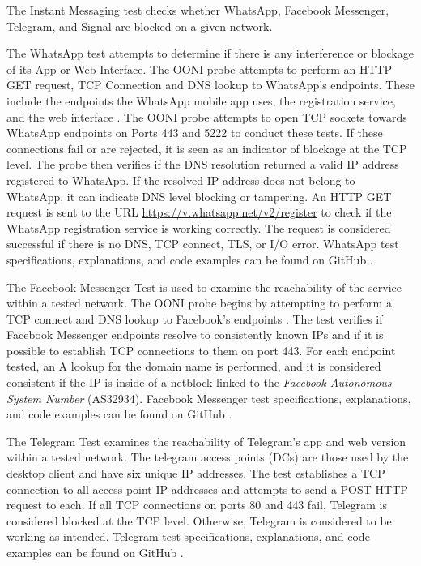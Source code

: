 The Instant Messaging test checks whether WhatsApp, Facebook Messenger, Telegram, and Signal are blocked on a given network.

The WhatsApp test attempts to determine if there is any interference or blockage of its App or Web Interface. The OONI probe attempts to perform an HTTP GET request, TCP Connection and DNS lookup to WhatsApp's endpoints. These include the endpoints the WhatsApp mobile app uses, the registration service, and the web interface \cite{ooniWhatsAppTest}. The OONI probe attempts to open TCP sockets towards WhatsApp endpoints on Ports 443 and 5222 to conduct these tests. If these connections fail or are rejected, it is seen as an indicator of blockage at the TCP level. The probe then verifies if the DNS resolution returned a valid IP address registered to WhatsApp. If the resolved IP address does not belong to WhatsApp, it can indicate DNS level blocking or tampering. An HTTP GET request is sent to the URL \url{https://v.whatsapp.net/v2/register} to check if the WhatsApp registration service is working correctly. The request is considered successful if there is no DNS, TCP connect, TLS, or I/O error. WhatsApp test specifications, explanations, and code examples can be found on GitHub \cite{WhatsAppTestGitHub}. 

The Facebook Messenger Test is used to examine the reachability of the service within a tested network. The OONI probe begins by attempting to perform a TCP connect and DNS lookup to Facebook's endpoints \cite{ooniFacebookMessenger}. The test verifies if Facebook Messenger endpoints resolve to consistently known IPs and if it is possible to establish TCP connections to them on port 443. For each endpoint tested, an A lookup for the domain name is performed, and it is considered consistent if the IP is inside of a netblock linked to the \textit{Facebook Autonomous System Number} (AS32934). Facebook Messenger test specifications, explanations, and code examples can be found on GitHub \cite{FacebookTestGitHub}.

The Telegram Test examines the reachability of Telegram's app and web version within a tested network. The telegram access points (DCs) are those used by the desktop client and have six unique IP addresses. The test establishes a TCP connection to all access point IP addresses and attempts to send a POST HTTP request to each. If all TCP connections on ports 80 and 443 fail, Telegram is considered blocked at the TCP level. Otherwise, Telegram is considered to be working as intended. Telegram test specifications, explanations, and code examples can be found on GitHub \cite{TelegramTestGitHub}. 

